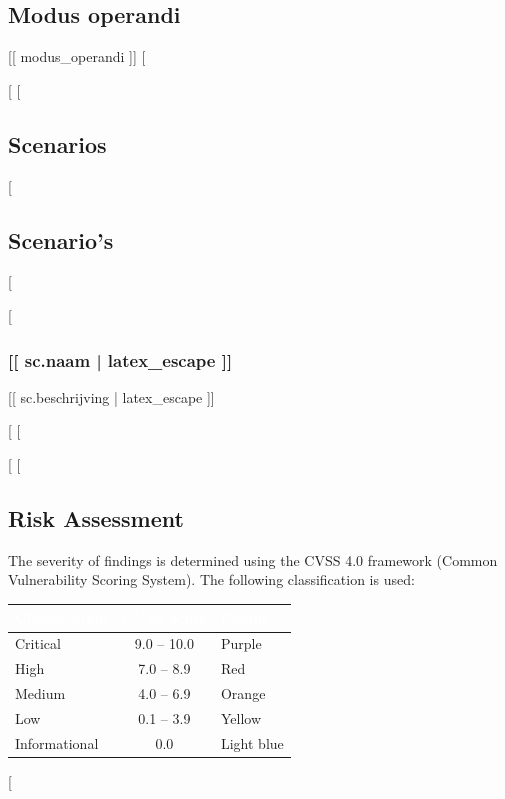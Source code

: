 {{{{\subsection{Modus operandi}

[[ modus_operandi ]]
[%

[%
[%
\subsection{Scenarios}
[%
\subsection{Scenario's}
[%

[%
\subsubsection{[[ sc.naam | latex_escape ]]}

[[ sc.beschrijving | latex_escape ]]

[%
[%

[%
[%
\subsection{Risk Assessment}

The severity of findings is determined using the CVSS 4.0 framework
(Common Vulnerability Scoring System). The following classification is used:

\begin{center}
\begin{tabular}{|l|c|l|}
  \hline
  \rowcolor{rijkblauw}\textcolor{white}{\textbf{Classification}} & \textcolor{white}{\textbf{CVSS Score}} & \textcolor{white}{\textbf{Colour}} \\
  \hline
  Critical & 9.0 -- 10.0 & \textcolor{opaars}{Purple} \\
  High & 7.0 -- 8.9 & \textcolor{ored}{Red} \\
  Medium & 4.0 -- 6.9 & \textcolor{oorange}{Orange} \\
  Low & 0.1 -- 3.9 & \textcolor{oyellow}{Yellow} \\
  Informational & 0.0 & \textcolor{olichtblauw}{Light blue} \\
  \hline
\end{tabular}
\end{center}
[%
}}}}
